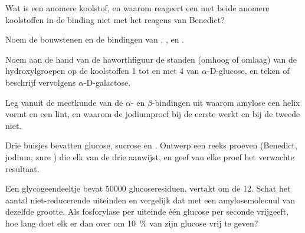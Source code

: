 \begin{exercise}[$\star$]\label{exo:b1:carbohydrates:2}
Wat is een anomere koolstof, en waarom reageert een  met beide anomere
koolstoffen in de binding niet met het reagens van Benedict?
\end{exercise}

\begin{exercise}[$\star$]\label{exo:b1:carbohydrates:3}
Noem de bouwstenen en de bindingen van , ,  en .
\end{exercise}

\begin{exercise}[$\star$]\label{exo:b1:carbohydrates:4}
Noem aan de hand van de haworthfiguur de standen (omhoog of omlaag) van de
hydroxylgroepen op de koolstoffen 1 tot en met 4 van $\alpha$-D-glucose, en teken
of beschrijf vervolgens $\alpha$-D-galactose.
\end{exercise}

\begin{exercise}[$\star\star$]\label{exo:b1:carbohydrates:5}
Leg vanuit de meetkunde van de $\alpha$- en $\beta$-bindingen uit waarom amylose
een helix vormt en  een lint, en waarom de jodiumproef bij de eerste
werkt en bij de tweede niet.
\end{exercise}

\begin{exercise}[$\star\star$]\label{exo:b1:carbohydrates:6}
Drie buisjes bevatten glucose, sucrose en . Ontwerp een reeks proeven
(Benedict, jodium, zure ) die elk van de drie aanwijst, en geef van elke
proef het verwachte resultaat.
\end{exercise}

\begin{exercise}[$\star\star$]\label{exo:b1:carbohydrates:7}
Een glycogeendeeltje bevat \num{50000} glucoseresiduen, vertakt om de 12. Schat
het aantal niet-reducerende uiteinden en vergelijk dat met een amylosemolecuul van
dezelfde grootte. Als fosforylase per uiteinde één glucose per seconde vrijgeeft,
hoe lang doet elk er dan over om \qty{10}{\%} van zijn glucose vrij te geven?
\end{exercise}

